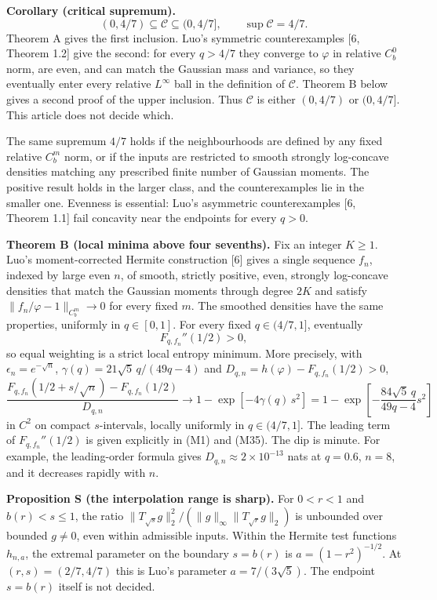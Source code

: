 \documentclass[
  british,
  10pt,
]{article}
\begin{document}
\textbf{Corollary (critical supremum).} \[
(0,4/7)\subseteq\mathcal C\subseteq(0,4/7],
\qquad
\boxed{\sup\mathcal C=4/7.}
\tag{B}
\] Theorem A gives the first inclusion. Luo's symmetric counterexamples
{[}6, Theorem 1.2{]} give the second: for every \(q>4/7\) they converge
to \(\varphi\) in relative \(C_b^0\) norm, are even, and can match the
Gaussian mass and variance, so they eventually enter every relative
\(L^\infty\) ball in the definition of \(\mathcal C\). Theorem B below
gives a second proof of the upper inclusion. Thus \(\mathcal C\) is
either \((0,4/7)\) or \((0,4/7]\). This article does not decide which.

The same supremum \(4/7\) holds if the neighbourhoods are defined by any
fixed relative \(C_b^m\) norm, or if the inputs are restricted to smooth
strongly log-concave densities matching any prescribed finite number of
Gaussian moments. The positive result holds in the larger class, and the
counterexamples lie in the smaller one. Evenness is essential: Luo's
asymmetric counterexamples {[}6, Theorem 1.1{]} fail concavity near the
endpoints for every \(q>0\).

\textbf{Theorem B (local minima above four sevenths).} Fix an integer
\(K\ge1\). Luo's moment-corrected Hermite construction {[}6{]} gives a
single sequence \(f_n\), indexed by large even \(n\), of smooth,
strictly positive, even, strongly log-concave densities that match the
Gaussian moments through degree \(2K\) and satisfy
\(\|f_n/\varphi-1\|_{C_b^m}\to0\) for every fixed \(m\). The smoothed
densities have the same properties, uniformly in \(q\in[0,1]\). For
every fixed \(q\in(4/7,1]\), eventually \[
F_{q,f_n}''(1/2)>0,
\tag{C}
\] so equal weighting is a strict local entropy minimum. More precisely,
with \(\epsilon_n=e^{-\sqrt n}\), \(\gamma(q)=21\sqrt5\,q/(49q-4)\) and
\(D_{q,n}=h(\varphi)-F_{q,f_n}(1/2)>0\), \[
\frac{F_{q,f_n}(1/2+s/\sqrt n)-F_{q,f_n}(1/2)}
     {D_{q,n}}
\longrightarrow
1-\exp\!\left[-4\gamma(q)\,s^2\right]
=1-\exp\!\left[-\frac{84\sqrt5\,q}{49q-4}s^2\right]
\tag{D}
\] in \(C^2\) on compact \(s\)-intervals, locally uniformly in
\(q\in(4/7,1]\). The leading term of \(F_{q,f_n}''(1/2)\) is given
explicitly in (M1) and (M35). The dip is minute. For example, the
leading-order formula gives \(D_{q,n}\approx2\times10^{-13}\) nats at
\(q=0.6\), \(n=8\), and it decreases rapidly with \(n\).

\textbf{Proposition S (the interpolation range is sharp).} For \(0<r<1\)
and \(b(r)<s\le1\), the ratio
\(\|T_{\sqrt s}g\|_2^2/(\|g\|_\infty\|T_{\sqrt r}g\|_2)\) is unbounded
over bounded \(g\ne0\), even within admissible inputs. Within the
Hermite test functions \(h_{n,a}\), the extremal parameter on the
boundary \(s=b(r)\) is \(a=(1-r^2)^{-1/2}\). At \((r,s)=(2/7,4/7)\) this
is Luo's parameter \(a=7/(3\sqrt5)\). The endpoint \(s=b(r)\) itself is
not decided.
\end{document}

